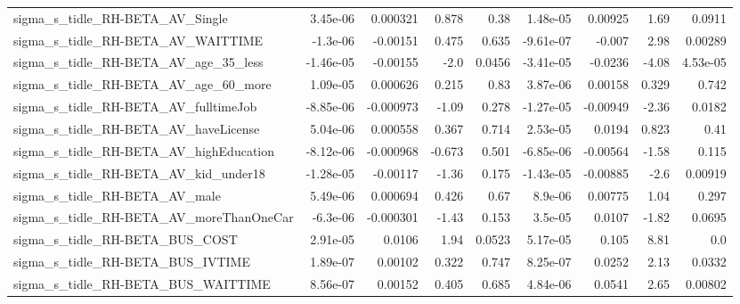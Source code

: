 \begin{tabular}{lrrrrrrrr}
sigma\_s\_tidle\_RH-BETA\_AV\_Single                    &    3.45e-06 &     0.000321 &     0.878 &     0.38 &   1.48e-05 &     0.00925 &         1.69 &        0.0911 \\
sigma\_s\_tidle\_RH-BETA\_AV\_WAITTIME                  &    -1.3e-06 &     -0.00151 &     0.475 &    0.635 &  -9.61e-07 &      -0.007 &         2.98 &       0.00289 \\
sigma\_s\_tidle\_RH-BETA\_AV\_age\_35\_less               &   -1.46e-05 &     -0.00155 &      -2.0 &   0.0456 &  -3.41e-05 &     -0.0236 &        -4.08 &      4.53e-05 \\
sigma\_s\_tidle\_RH-BETA\_AV\_age\_60\_more               &    1.09e-05 &     0.000626 &     0.215 &     0.83 &   3.87e-06 &     0.00158 &        0.329 &         0.742 \\
sigma\_s\_tidle\_RH-BETA\_AV\_fulltimeJob               &   -8.85e-06 &    -0.000973 &     -1.09 &    0.278 &  -1.27e-05 &    -0.00949 &        -2.36 &        0.0182 \\
sigma\_s\_tidle\_RH-BETA\_AV\_haveLicense               &    5.04e-06 &     0.000558 &     0.367 &    0.714 &   2.53e-05 &      0.0194 &        0.823 &          0.41 \\
sigma\_s\_tidle\_RH-BETA\_AV\_highEducation             &   -8.12e-06 &    -0.000968 &    -0.673 &    0.501 &  -6.85e-06 &    -0.00564 &        -1.58 &         0.115 \\
sigma\_s\_tidle\_RH-BETA\_AV\_kid\_under18               &   -1.28e-05 &     -0.00117 &     -1.36 &    0.175 &  -1.43e-05 &    -0.00885 &         -2.6 &       0.00919 \\
sigma\_s\_tidle\_RH-BETA\_AV\_male                      &    5.49e-06 &     0.000694 &     0.426 &     0.67 &    8.9e-06 &     0.00775 &         1.04 &         0.297 \\
sigma\_s\_tidle\_RH-BETA\_AV\_moreThanOneCar            &    -6.3e-06 &    -0.000301 &     -1.43 &    0.153 &    3.5e-05 &      0.0107 &        -1.82 &        0.0695 \\
sigma\_s\_tidle\_RH-BETA\_BUS\_COST                     &    2.91e-05 &       0.0106 &      1.94 &   0.0523 &   5.17e-05 &       0.105 &         8.81 &           0.0 \\
sigma\_s\_tidle\_RH-BETA\_BUS\_IVTIME                   &    1.89e-07 &      0.00102 &     0.322 &    0.747 &   8.25e-07 &      0.0252 &         2.13 &        0.0332 \\
sigma\_s\_tidle\_RH-BETA\_BUS\_WAITTIME                 &    8.56e-07 &      0.00152 &     0.405 &    0.685 &   4.84e-06 &      0.0541 &         2.65 &       0.00802 \\

\end{tabular}
